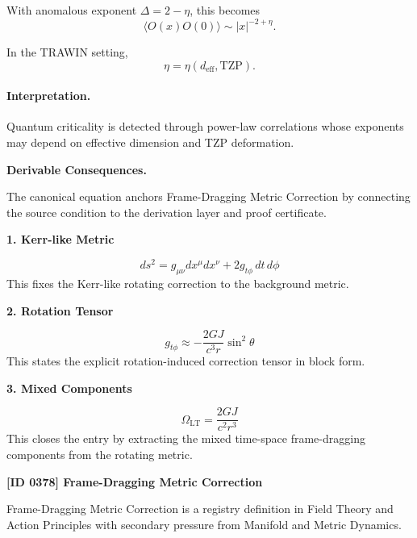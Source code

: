 With anomalous exponent $\Delta=2-\eta$, this becomes
\begin{equation}
\boxed{
\langle O(x)O(0)\rangle
\sim
|x|^{-2+\eta}.
}
\end{equation}

In the TRAWIN setting,
\begin{equation}
\eta=\eta(d_{\mathrm{eff}},\mathrm{TZP}).
\end{equation}

\paragraph{Interpretation.}
Quantum criticality is detected through power-law correlations whose exponents may depend on effective dimension and TZP deformation.

\par\vspace{0.35em}
\noindent\textbf{Derivable Consequences.}\quad
\begingroup
\footnotesize
\raggedright
The canonical equation anchors Frame-Dragging Metric Correction by connecting the source condition to the derivation layer and proof certificate.
\par\endgroup

\noindent\textbf{1. Kerr-like Metric}\par
\[
ds^{2}=g_{\mu\nu}dx^{\mu}dx^{\nu}+2g_{t\phi}\,dt\,d\phi
\]
\noindent This fixes the Kerr-like rotating correction to the background metric.\par
\noindent\textbf{2. Rotation Tensor}\par
\[
g_{t\phi}\approx-\frac{2GJ}{c^{3}r}\sin^{2}\theta
\]
\noindent This states the explicit rotation-induced correction tensor in block form.\par
\noindent\textbf{3. Mixed Components}\par
\[
\Omega_{\mathrm{LT}}=\frac{2GJ}{c^{2}r^{3}}
\]
\noindent This closes the entry by extracting the mixed time-space frame-dragging components from the rotating metric.\par

\clearpage
\noindent\textbf{[ID 0378] Frame-Dragging Metric Correction}\par
\vspace{0.35em}
\begingroup\small
{}
Frame-Dragging Metric Correction is a registry definition in Field Theory and Action Principles with secondary pressure from Manifold and Metric Dynamics.


